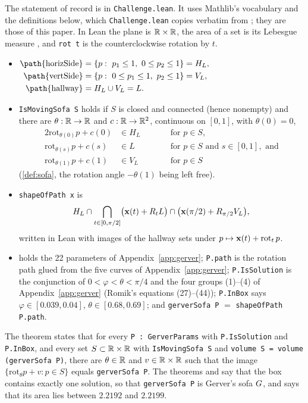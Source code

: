 The statement of record is  in
\texttt{Challenge.lean}. It uses Mathlib's vocabulary and the definitions below,
which \texttt{Challenge.lean} copies verbatim from ;
they are those of this paper. In Lean the plane is $\mathbb{R}\times\mathbb{R}$, the area of a
set is its Lebesgue measure , and \texttt{rot t} is the
counterclockwise rotation by $t$.
\begin{itemize}
\item $\begin{aligned}[t]
  \text{\path{horizSide}}&=\{p:\ p_1\le1,\ 0\le p_2\le1\}=H_L,\\
  \text{\path{vertSide}}&=\{p:\ 0\le p_1\le1,\ p_2\le1\}=V_L,\\
  \text{\path{hallway}}&=H_L\cup V_L=L.
\end{aligned}$
\item \texttt{IsMovingSofa S} holds if $S$ is closed and connected (hence
nonempty) and there are $\theta:\mathbb{R}\to\mathbb{R}$ and $c:\mathbb{R}\to\mathbb{R}^2$, continuous on
$[0,1]$, with $\theta(0)=0$,
\begin{alignat*}{2}
  \mathrm{rot}_{\theta(0)}p+c(0)&\in H_L &\qquad&\text{for } p\in S,\\
  \mathrm{rot}_{\theta(s)}p+c(s)&\in L &&\text{for } p\in S \text{ and }
    s\in[0,1], \text{ and}\\
  \mathrm{rot}_{\theta(1)}p+c(1)&\in V_L &&\text{for } p\in S
\end{alignat*}
(\cref{def:sofa}, the rotation angle $-\theta(1)$ being left free).
\item \texttt{shapeOfPath x} is
\[
  H_L\cap\bigcap_{t\in[0,\pi/2]}\bigl(\mathbf{x}(t)+R_tL\bigr)
  \cap\bigl(\mathbf{x}(\pi/2)+R_{\pi/2}V_L\bigr),
\]
written in Lean with images of the hallway sets under
$p\mapsto\mathbf{x}(t)+\mathrm{rot}_t\,p$.
\item {} holds the 22 parameters of Appendix~\ref{app:gerver};
\texttt{P.path} is the rotation path glued from the five curves of
Appendix~\ref{app:gerver}; \texttt{P.IsSolution} is the conjunction of
$0<\varphi<\theta<\pi/4$ and the four groups (1)--(4) of
Appendix~\ref{app:gerver} (Romik's equations (27)--(44)); \texttt{P.InBox} says
$\varphi\in[0.039,0.04]$, $\theta\in[0.68,0.69]$; and \texttt{gerverSofa P} $=$
\texttt{shapeOfPath P.path}.
\end{itemize}
The theorem states that for every \texttt{P : GerverParams} with
\texttt{P.IsSolution} and \texttt{P.InBox}, and every set $S\subset\mathbb{R}\times\mathbb{R}$
with \texttt{IsMovingSofa S} and \texttt{volume S = volume (gerverSofa P)},
there are $\theta\in\mathbb{R}$ and $v\in\mathbb{R}\times\mathbb{R}$ such that the image
$\{\mathrm{rot}_\theta p+v:p\in S\}$ equals \texttt{gerverSofa P}. The theorems
 and  say that
the box contains exactly one solution, so that \texttt{gerverSofa P} is Gerver's
sofa $G$, and  says that its area lies between
$2.2192$ and $2.2199$.

